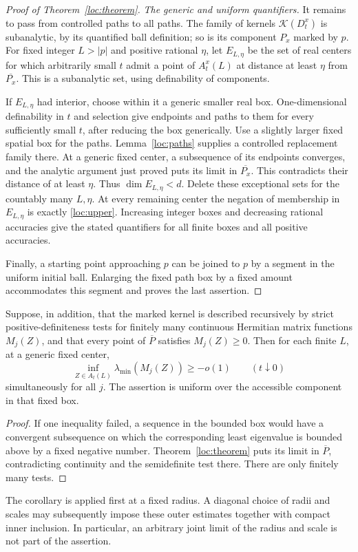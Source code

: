 \begin{proof}[Proof of Theorem~\ref{loc:theorem}]
\emph{The generic and uniform quantifiers.}
It remains to pass from controlled paths to all paths.  The family
of kernels $\mathcal K(D_t^x)$ is subanalytic, by its quantified ball
definition; so is its component $P_x$ marked by $p$.  For fixed integer
$L>|p|$ and positive rational $\eta$, let $E_{L,\eta}$ be the set of
real centers for which arbitrarily small $t$ admit a point of
$A_t^x(L)$ at distance at least $\eta$ from $\overline{P_x}$.
This is a subanalytic set, using definability of components.

If $E_{L,\eta}$ had interior, choose within it a generic smaller real
box.  One-dimensional definability in $t$ and selection give endpoints
and paths to them for every sufficiently small $t$, after reducing
the box generically.  Use a slightly larger fixed spatial box for the
paths.  Lemma~\ref{loc:paths} supplies a controlled replacement family
there.  At a generic fixed center, a subsequence of its endpoints
converges, and the analytic argument just proved puts its limit in
$\overline{P_x}$.  This contradicts their distance of at least $\eta$.
Thus $\dim E_{L,\eta}<d$.  Delete these exceptional sets for the
countably many $L,\eta$.  At every remaining center the negation of
membership in $E_{L,\eta}$ is exactly \eqref{loc:upper}.  Increasing
integer boxes and decreasing rational accuracies give the stated
quantifiers for all finite boxes and all positive accuracies.

Finally, a starting point approaching $p$ can be joined to $p$ by a
segment in the uniform initial ball.  Enlarging the fixed path box
by a fixed amount accommodates this segment and proves the last
assertion.
\end{proof}

\begin{corollary}\label{loc:matrix-outer}
Suppose, in addition, that the marked kernel is described recursively
by strict positive-definiteness tests for finitely many continuous
Hermitian matrix functions $M_j(Z)$, and that every point of
$\overline P$ satisfies $M_j(Z)\geq0$.  Then for each finite $L$,
at a generic fixed center,
\[
 \inf_{Z\in A_t(L)}\lambda_{\min}(M_j(Z))\geq-o(1)
                \qquad(t\downarrow0)
\]
simultaneously for all $j$.  The assertion is uniform over the
accessible component in that fixed box.
\end{corollary}

\begin{proof}
If one inequality failed, a sequence in the bounded box would have
a convergent subsequence on which the corresponding least eigenvalue
is bounded above by a fixed negative number.  Theorem~\ref{loc:theorem}
puts its limit in $\overline P$, contradicting continuity and the
semidefinite test there.  There are only finitely many tests.
\end{proof}

The corollary is applied first at a fixed radius.  A diagonal choice
of radii and scales may subsequently impose these outer estimates
together with compact inner inclusion.  In particular, an arbitrary
joint limit of the radius and scale is not part of the assertion.
